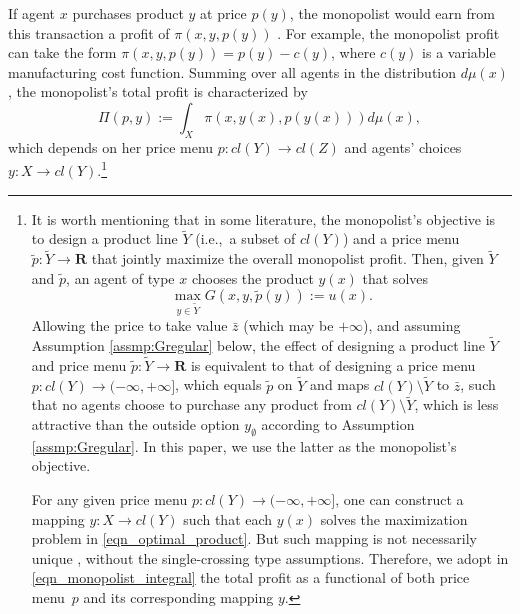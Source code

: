 \documentclass[a4paper, 11pt]{amsart}
\numberwithin{equation}{section}
\theoremstyle{plain}
\theoremstyle{definition}
\theoremstyle{remark}
\newcommand{\R}{\mathbf{R}}
\begin{document}
If agent $x$ purchases product $y$ at price $p(y)$, the monopolist would earn from this transaction a profit of $\pi(x,y,p(y))$%
.  {For example, the monopolist profit can take the form $\pi(x,y,p(y)) = p(y)-c(y)$, where %
$c(y)$ is a variable manufacturing cost function.} Summing over all agents in the distribution $d\mu(x)$, the monopolist's total profit is characterized by 
\begin{equation}\label{eqn_monopolist_integral}
	\Pi(p, y):=\int_{X} \pi(x, y(x), p(y(x))) d\mu(x),
\end{equation}
which depends on her price menu $p: cl(Y) \rightarrow cl(Z)$ and  agents' choices $y: X \rightarrow cl(Y)$.\footnote{It is worth mentioning that in some literature, the monopolist's objective is to design a product line $\tilde{Y}$ (i.e.,~a subset of $cl(Y)$) and a price menu $\tilde{p}: \tilde{Y} \rightarrow \R$ that jointly maximize the overall monopolist profit. Then, given $\tilde{Y}$ and $\tilde{p}$, an agent of type $x$ chooses the product $y(x)$ that solves
	\begin{equation*}
		\max_{y \in \tilde{Y}} G(x,y, \tilde{p}(y)):= u(x).
	\end{equation*}
Allowing the price to take value $\bar{z}$ (which may be $+\infty$), and assuming Assumption \ref{assmp:Gregular} below, the effect of designing a product line $\tilde{Y}$ and price menu $\tilde{p}: \tilde{Y}\rightarrow \R$ is equivalent to that of designing a price menu $p : cl(Y)\rightarrow (-\infty, +\infty]$, which equals $\tilde{p}$ on $\tilde{Y}$ and maps $cl(Y) \setminus \tilde{Y}$ to $\bar{z}$, such that no agents choose to purchase any product from $cl(Y) \setminus \tilde{Y}$, which is less attractive than the outside option $y_{\emptyset}$ according to Assumption \ref{assmp:Gregular}. In this paper, we use the latter as the monopolist's objective.
 \vspace{0.1cm}
 
For any given price menu $p: cl(Y)\rightarrow (-\infty, +\infty]$, one can construct a mapping $y: X \rightarrow cl(Y)$ such that each $y(x)$ solves the maximization problem in \eqref{eqn_optimal_product}. But such mapping is not necessarily unique%
, without the single-crossing type assumptions. %
Therefore, we adopt in \eqref{eqn_monopolist_integral} the total profit as a functional of both price menu~$p$ and its corresponding mapping $y$.}\medskip
\end{document}
